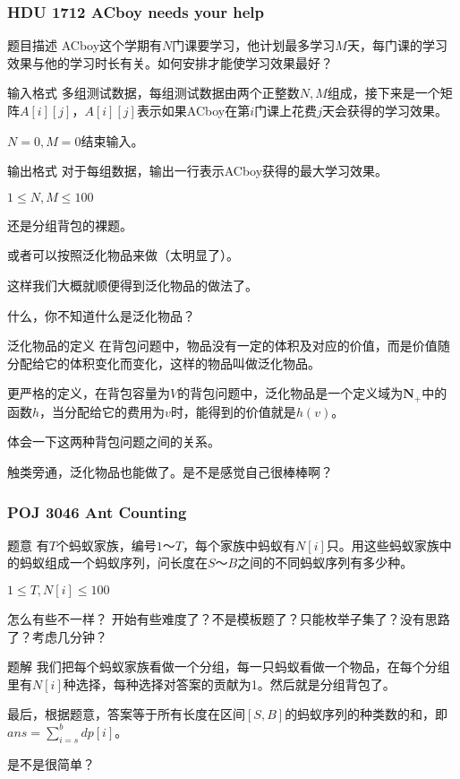 \documentclass[UTF-8,aspectratio=1610]{ctexbeamer}
\begin{document}
\begin{frame}
\frametitle{HDU 1712 ACboy needs your help}
\begin{block}{题目描述}
ACboy这个学期有$N$门课要学习，他计划最多学习$M$天，每门课的学习效果与他的学习时长有关。如何安排才能使学习效果最好？
\end{block}
\begin{alertblock}{输入格式}
多组测试数据，每组测试数据由两个正整数$N,M$组成，接下来是一个矩阵$A[i][j]$，$A[i][j]$表示如果ACboy在第$i$门课上花费$j$天会获得的学习效果。

$N=0,M=0$结束输入。
\end{alertblock}
\begin{exampleblock}{输出格式}
对于每组数据，输出一行表示ACboy获得的最大学习效果。

$1\leqslant N,M\leqslant 100$
\end{exampleblock}
\end{frame}
\begin{frame}
还是分组背包的裸题。\pause

或者可以按照泛化物品来做（太明显了）。\pause

这样我们大概就顺便得到泛化物品的做法了。\pause

什么，你不知道什么是泛化物品？\pause

\begin{alertblock}{泛化物品的定义}
在背包问题中，物品没有一定的体积及对应的价值，而是价值随分配给它的体积变化而变化，这样的物品叫做泛化物品。

更严格的定义，在背包容量为$V$的背包问题中，泛化物品是一个定义域为$\mathbf{N_+}$中的函数$h$，当分配给它的费用为$v$时，能得到的价值就是$h(v)$。
\end{alertblock}\pause

体会一下这两种背包问题之间的关系。\pause

触类旁通，泛化物品也能做了。是不是感觉自己很棒棒啊？
\end{frame}
\begin{frame}
\frametitle{POJ 3046 Ant Counting}
\begin{block}{题意}
有$T$个蚂蚁家族，编号$1$～$T$，每个家族中蚂蚁有$N[i]$只。用这些蚂蚁家族中的蚂蚁组成一个蚂蚁序列，问长度在$S$～$B$之间的不同蚂蚁序列有多少种。

$1\leqslant T,N[i]\leqslant 100$
\end{block}
\pause
\begin{alertblock}{怎么有些不一样？}
开始有些难度了？不是模板题了？只能枚举子集了？没有思路了？考虑几分钟？
\end{alertblock}
\pause
\begin{exampleblock}{题解}
我们把每个蚂蚁家族看做一个分组，每一只蚂蚁看做一个物品，在每个分组里有$N[i]$种选择，每种选择对答案的贡献为1。然后就是分组背包了。\pause

最后，根据题意，答案等于所有长度在区间$[S,B]$的蚂蚁序列的种类数的和，即$ans=\sum_{i=s}^bdp[i]$。\pause

是不是很简单？
\end{exampleblock}
\end{frame}
\end{document}
